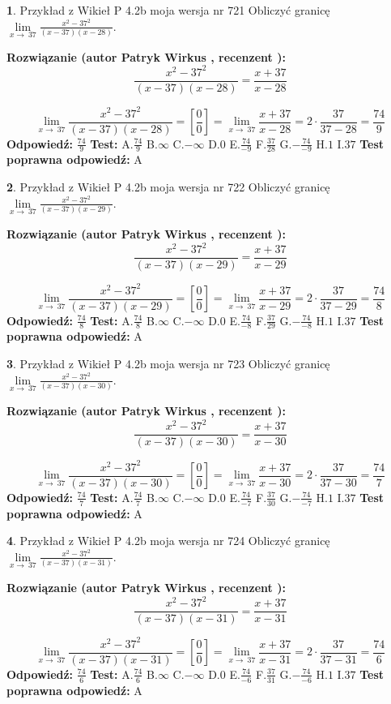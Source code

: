 \documentclass[12pt, a4paper]{article}
\theoremstyle{definition} %
\newtheorem{zad}{}
\newcommand{\zadStart}[1]{\begin{zad}#1\newline}
\newcommand{\zadStop}{\end{zad}}
\newcommand{\rozwStart}[2]{\noindent \textbf{Rozwiązanie (autor #1 , recenzent #2): }\newline}
\newcommand{\rozwStop}{\newline}
\newcommand{\odpStart}{\noindent \textbf{Odpowiedź:}\newline}
\newcommand{\odpStop}{\newline}
\newcommand{\testStart}{\noindent \textbf{Test:}\newline}
\newcommand{\testStop}{\newline}
\newcommand{\kluczStart}{\noindent \textbf{Test poprawna odpowiedź:}\newline}
\newcommand{\kluczStop}{\newline}
\begin{document}
\zadStart{Przykład z Wikieł P 4.2b moja wersja nr 721}
Obliczyć granicę $\lim\limits_{x\to\ 37}\frac{x^{2}-37^{2}}{(x-37)(x-28)}$.
\zadStop
\rozwStart{Patryk Wirkus}{}
$$\frac{x^{2}-37^{2}}{(x-37)(x-28)}=\frac{x+37}{x-28}$$

$$\lim\limits_{x\to\ 37}\frac{x^{2}-37^{2}}{(x-37)(x-28)}=[\frac{0}{0}]=\lim\limits_{x\to\ 37}\frac{x+37}{x-28}=2 \cdot \frac{37}{37-28} = \frac{74}{9}$$
\rozwStop
\odpStart
$\frac{74}{9}$
\odpStop
\testStart
A.$\frac{74}{9}$
B.$\infty$
C.$-\infty$
D.$0$
E.$\frac{74}{-9}$
F.$\frac{37}{28}$
G.$-\frac{74}{-9}$
H.$1$
I.$37$
\testStop
\kluczStart
A
\kluczStop



\zadStart{Przykład z Wikieł P 4.2b moja wersja nr 722}
Obliczyć granicę $\lim\limits_{x\to\ 37}\frac{x^{2}-37^{2}}{(x-37)(x-29)}$.
\zadStop
\rozwStart{Patryk Wirkus}{}
$$\frac{x^{2}-37^{2}}{(x-37)(x-29)}=\frac{x+37}{x-29}$$

$$\lim\limits_{x\to\ 37}\frac{x^{2}-37^{2}}{(x-37)(x-29)}=[\frac{0}{0}]=\lim\limits_{x\to\ 37}\frac{x+37}{x-29}=2 \cdot \frac{37}{37-29} = \frac{74}{8}$$
\rozwStop
\odpStart
$\frac{74}{8}$
\odpStop
\testStart
A.$\frac{74}{8}$
B.$\infty$
C.$-\infty$
D.$0$
E.$\frac{74}{-8}$
F.$\frac{37}{29}$
G.$-\frac{74}{-8}$
H.$1$
I.$37$
\testStop
\kluczStart
A
\kluczStop



\zadStart{Przykład z Wikieł P 4.2b moja wersja nr 723}
Obliczyć granicę $\lim\limits_{x\to\ 37}\frac{x^{2}-37^{2}}{(x-37)(x-30)}$.
\zadStop
\rozwStart{Patryk Wirkus}{}
$$\frac{x^{2}-37^{2}}{(x-37)(x-30)}=\frac{x+37}{x-30}$$

$$\lim\limits_{x\to\ 37}\frac{x^{2}-37^{2}}{(x-37)(x-30)}=[\frac{0}{0}]=\lim\limits_{x\to\ 37}\frac{x+37}{x-30}=2 \cdot \frac{37}{37-30} = \frac{74}{7}$$
\rozwStop
\odpStart
$\frac{74}{7}$
\odpStop
\testStart
A.$\frac{74}{7}$
B.$\infty$
C.$-\infty$
D.$0$
E.$\frac{74}{-7}$
F.$\frac{37}{30}$
G.$-\frac{74}{-7}$
H.$1$
I.$37$
\testStop
\kluczStart
A
\kluczStop



\zadStart{Przykład z Wikieł P 4.2b moja wersja nr 724}
Obliczyć granicę $\lim\limits_{x\to\ 37}\frac{x^{2}-37^{2}}{(x-37)(x-31)}$.
\zadStop
\rozwStart{Patryk Wirkus}{}
$$\frac{x^{2}-37^{2}}{(x-37)(x-31)}=\frac{x+37}{x-31}$$

$$\lim\limits_{x\to\ 37}\frac{x^{2}-37^{2}}{(x-37)(x-31)}=[\frac{0}{0}]=\lim\limits_{x\to\ 37}\frac{x+37}{x-31}=2 \cdot \frac{37}{37-31} = \frac{74}{6}$$
\rozwStop
\odpStart
$\frac{74}{6}$
\odpStop
\testStart
A.$\frac{74}{6}$
B.$\infty$
C.$-\infty$
D.$0$
E.$\frac{74}{-6}$
F.$\frac{37}{31}$
G.$-\frac{74}{-6}$
H.$1$
I.$37$
\testStop
\kluczStart
A
\kluczStop
\end{document}
